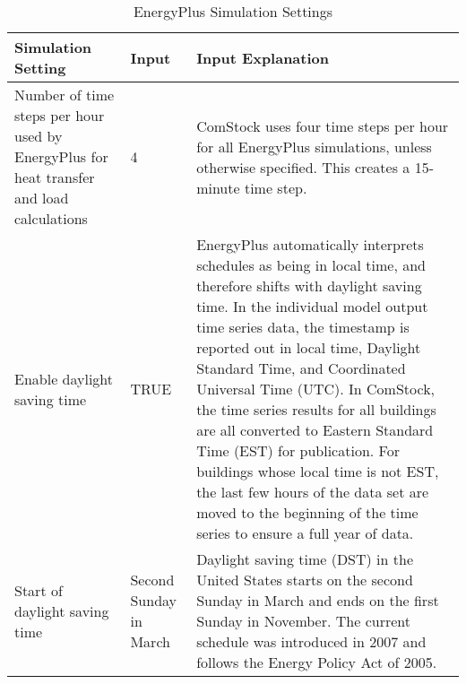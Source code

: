 \begin{table}[h!]
\small
\caption[EnergyPlus Simulation Settings]{EnergyPlus Simulation Settings}
\label{tab:simulation_settings}
\centering
\begin{tabular}{|p{1.25in}|p{0.75in}|p{4in}|}
\hline
\textbf{Simulation Setting}                                                               & \textbf{Input}         & \textbf{Input Explanation } \\ \hline
Number of time steps per hour used by EnergyPlus for heat transfer and load calculations   & 4                      & ComStock uses four time steps per hour for all EnergyPlus simulations, unless otherwise specified. This creates a 15-minute time step.                                                                                                                                                                                                                                                                                                                                                                                                                                     \\ \hline
Enable daylight saving time                                                              & TRUE                   & EnergyPlus automatically interprets schedules as being in local time, and therefore shifts with daylight saving time. In the individual model output time series data, the timestamp is reported out in local time, Daylight Standard Time, and Coordinated Universal Time (UTC). In ComStock, the time series results for all buildings are all converted to Eastern Standard Time (EST) for publication. For buildings whose local time is not EST, the last few hours of the data set are moved to the beginning of the time series to ensure a full year of data. \\ \hline
Start of daylight saving time                                                            & Second Sunday in March    & \multirow{2}{4in}{Daylight saving time (DST) in the United States starts on the second Sunday in March and ends on the first Sunday in November. The current schedule was introduced in 2007 and follows the Energy Policy Act of 2005.}                                                                                                                                                                                                                                                                                                                             \\ 

\end{tabular}
\end{table}
